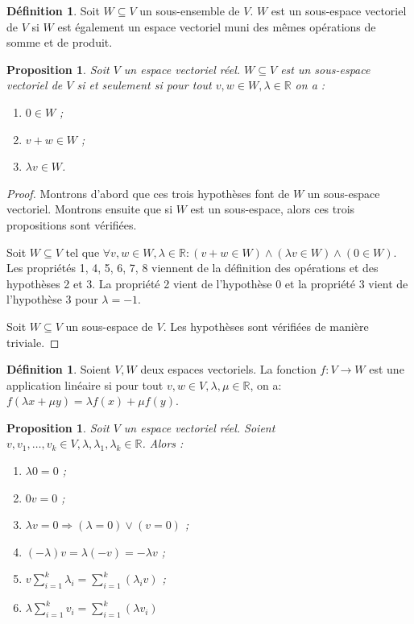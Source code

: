 \documentclass{article}
\newcommand{\R}{\mathbb R}
\newtheorem{prp}[thm]{Proposition}
\theoremstyle{definition}
\newtheorem{déf}[thm]{Définition}
\theoremstyle{remark}
\begin{document}
		\begin{déf} Soit $W \subseteq V$ un sous-ensemble de $V$. $W$ est un sous-espace vectoriel de $V$ si $W$ est également un espace vectoriel muni des mêmes opérations
		de somme et de produit. \end{déf}

		\begin{prp}\label{conditionsSousEspace} Soit $V$ un espace vectoriel réel. $W \subseteq V$ est un sous-espace vectoriel de $V$ si et seulement si pour tout
		$v, w \in W, \lambda \in \R$ on a :
		\begin{enumerate}
			\item $0 \in W$ ;
			\item $v+w \in W$ ;
			\item $\lambda v \in W$.
		\end{enumerate}
		\end{prp}

		\begin{proof} Montrons d'abord que ces trois hypothèses font de $W$ un sous-espace vectoriel. Montrons ensuite que si $W$ est un sous-espace, alors ces trois
		propositions sont vérifiées.

		Soit $W \subseteq V$ tel que $\forall v, w \in W, \lambda \in \R : (v+w \in W) \land (\lambda v \in W) \land (0 \in W)$. Les propriétés 1, 4, 5, 6, 7, 8 viennent de
		la définition des opérations et des hypothèses 2 et 3. La propriété 2 vient de l'hypothèse 0 et la propriété 3 vient de l'hypothèse 3 pour $\lambda = -1$.

		Soit $W \subseteq V$ un sous-espace de $V$. Les hypothèses sont vérifiées de manière triviale. \end{proof}

		\begin{déf} Soient $V, W$ deux espaces vectoriels. La fonction $f : V \to W$ est une application linéaire si pour tout $v, w \in V, \lambda, \mu \in \R$, on a:
		$f(\lambda x + \mu y) = \lambda f(x) + \mu f(y)$. \end{déf}

		\begin{prp} Soit $V$ un espace vectoriel réel. Soient $v, v_1, \ldots, v_k \in V, \lambda, \lambda_1, \lambda_k \in \R$. Alors :
		\begin{enumerate}
			\item $\lambda 0 = 0$ ;
			\item $0v = 0$ ;
			\item $\lambda v = 0 \Rightarrow (\lambda = 0) \lor (v = 0)$ ;
			\item $(-\lambda)v = \lambda(-v) = -\lambda v$ ;
			\item $\displaystyle v\sum_{i=1}^k\lambda_i = \sum_{i=1}^k(\lambda_i v)$ ;
			\item $\lambda \displaystyle \sum_{i=1}^kv_i = \sum_{i=1}^k(\lambda v_i)$
		\end{enumerate}
		\end{prp}
\end{document}
